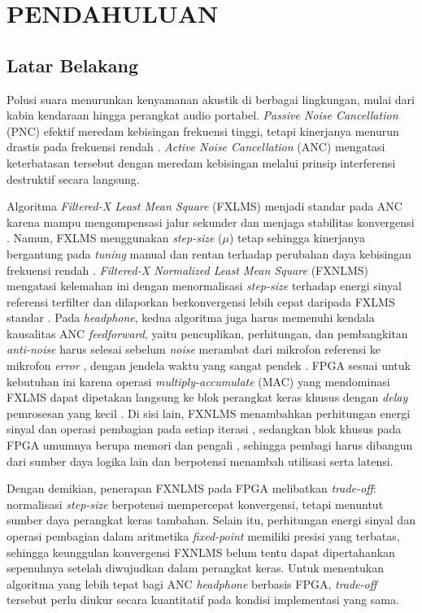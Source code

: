 \chapter{PENDAHULUAN}
\label{chap:pendahuluan}

\section{Latar Belakang}
\label{sec:latarbelakang}

Polusi suara menurunkan kenyamanan akustik di berbagai lingkungan, mulai dari kabin kendaraan hingga perangkat audio portabel. \emph{Passive Noise Cancellation} (PNC) efektif meredam kebisingan frekuensi tinggi, tetapi kinerjanya menurun drastis pada frekuensi rendah \parencite{chen2025,han2023}. \emph{Active Noise Cancellation} (ANC) mengatasi keterbatasan tersebut dengan meredam kebisingan melalui prinsip interferensi destruktif secara langsung.

Algoritma \emph{Filtered-X Least Mean Square} (FXLMS) menjadi standar pada ANC karena mampu mengompensasi jalur sekunder dan menjaga stabilitas konvergensi \parencite{han2023,xie2022}. Namun, FXLMS menggunakan \emph{step-size} ($\mu$) tetap sehingga kinerjanya bergantung pada \emph{tuning} manual dan rentan terhadap perubahan daya kebisingan frekuensi rendah \parencite{cesur2025}. \emph{Filtered-X Normalized Least Mean Square} (FXNLMS) mengatasi kelemahan ini dengan menormalisasi \emph{step-size} terhadap energi sinyal referensi terfilter dan dilaporkan berkonvergensi lebih cepat daripada FXLMS standar \parencite{cesur2025}. Pada \emph{headphone}, kedua algoritma juga harus memenuhi kendala kausalitas ANC \emph{feedforward}, yaitu pencuplikan, perhitungan, dan pembangkitan \emph{anti-noise} harus selesai sebelum \emph{noise} merambat dari mikrofon referensi ke mikrofon \emph{error} \parencite{zhangqiu2014}, dengan jendela waktu yang sangat pendek \parencite{shi2023anc}. FPGA sesuai untuk kebutuhan ini karena operasi \emph{multiply-accumulate} (MAC) yang mendominasi FXLMS dapat dipetakan langsung ke blok perangkat keras khusus dengan \emph{delay} pemrosesan yang kecil \parencite{klemd2023}. Di sisi lain, FXNLMS menambahkan perhitungan energi sinyal dan operasi pembagian pada setiap iterasi \parencite{li2026}, sedangkan blok khusus pada FPGA umumnya berupa memori dan pengali \parencite{boutros2021}, sehingga pembagi harus dibangun dari sumber daya logika lain dan berpotensi menambah utilisasi serta latensi.

Dengan demikian, penerapan FXNLMS pada FPGA melibatkan \emph{trade-off}: normalisasi \emph{step-size} berpotensi mempercepat konvergensi, tetapi menuntut sumber daya perangkat keras tambahan. Selain itu, perhitungan energi sinyal dan operasi pembagian dalam aritmetika \emph{fixed-point} memiliki presisi yang terbatas, sehingga keunggulan konvergensi FXNLMS belum tentu dapat dipertahankan sepenuhnya setelah diwujudkan dalam perangkat keras. Untuk menentukan algoritma yang lebih tepat bagi ANC \emph{headphone} berbasis FPGA, \emph{trade-off} tersebut perlu diukur secara kuantitatif pada kondisi implementasi yang sama.

